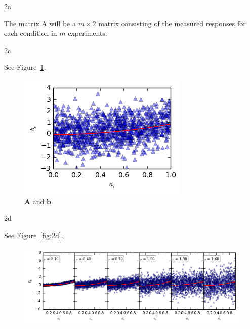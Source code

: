 \documentclass{article}
\begin{document}
\begin{homeworkProblem}

    \begin{homeworkSection}{2a}
        
        The matrix A will be a $m \times 2$ matrix consisting of the measured
        responses for each condition in $m$ experiments.

    \end{homeworkSection}

    \begin{homeworkSection}{2c}

                See Figure~\ref{fig:2c}.

        \begin{figure}[!ht]
            \begin{centering}
            \includegraphics[scale=1]{problem2c_fig.png}

            \caption{\label{fig:2c} $\bm{A}$ and $\bm{b}$.}
            
            \end{centering}
        \end{figure}

    \end{homeworkSection}

    \begin{homeworkSection}{2d}

                See Figure~\ref{fig:2d}.

        \begin{figure}[!ht]
        \begin{centering}
            \includegraphics[scale=1]{problem2d_fig.png}


\end{centering}
\end{figure}
\end{homeworkSection}
\end{homeworkProblem}
\end{document}
